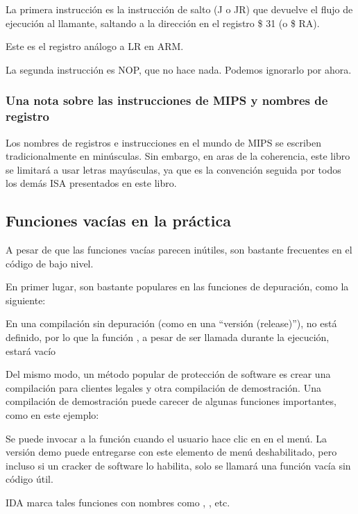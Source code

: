 La primera instrucción es la instrucción de salto (J o JR) que devuelve el flujo de ejecución al \gls {llamante},
saltando a la dirección en el registro \$ 31 (o \$ RA).

Este es el registro análogo a \ac{LR} en ARM.

La segunda instrucción es \ac{NOP}, que no hace nada.
Podemos ignorarlo por ahora.

\subsubsection{Una nota sobre las instrucciones de MIPS y nombres de registro}

Los nombres de registros e instrucciones en el mundo de MIPS se escriben tradicionalmente en minúsculas.
Sin embargo, en aras de la coherencia, este libro se limitará a usar letras mayúsculas,
ya que es la convención seguida por todos los demás \ac {ISA} presentados en este libro.

\subsection{Funciones vacías en la práctica}

A pesar de que las funciones vacías parecen inútiles, son bastante frecuentes en el código de bajo nivel.

En primer lugar, son bastante populares en las funciones de depuración, como la siguiente:



En una compilación sin depuración (como en una ``versión (release)''),  no está definido,
por lo que la función , a pesar de ser llamada durante la ejecución,
estará vacío

Del mismo modo, un método popular de protección de software es crear una compilación para clientes legales y otra compilación de demostración.
Una compilación de demostración puede carecer de algunas funciones importantes, como en este ejemplo:



Se puede invocar a la función  cuando el usuario hace clic en  en el menú.
La versión demo puede entregarse con este elemento de menú deshabilitado, pero incluso si un cracker de software lo habilita,
solo se llamará una función vacía sin código útil.

IDA marca tales funciones con nombres como , , etc.
